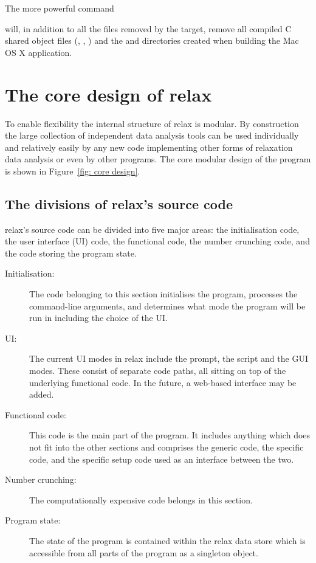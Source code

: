 The more powerful command


will, in addition to all the files removed by the  target, remove all compiled C shared object files (, , ) and the  and  directories created when building the Mac OS X application.




\section{The core design of relax}

To enable flexibility the internal structure of relax is modular.
By construction the large collection of independent data analysis tools can be used individually and relatively easily by any new code implementing other forms of relaxation data analysis or even by other programs.
The core modular design of the program is shown in Figure~\ref{fig: core design}.



\subsection{The divisions of relax's source code}

relax's source code can be divided into five major areas:  the initialisation code, the user interface (UI) code, the functional code, the number crunching code, and the code storing the program state.
\begin{description}
  \item[Initialisation:]  The code belonging to this section initialises the program, processes the command-line arguments, and determines what mode the program will be run in including the choice of the UI.
  \item[UI:]  The current UI modes in relax include the prompt, the script and the GUI modes.
    These consist of separate code paths, all sitting on top of the underlying functional code.
    In the future, a web-based interface may be added.
  \item[Functional code:]  This code is the main part of the program.
    It includes anything which does not fit into the other sections and comprises the generic code, the specific code, and the specific setup code used as an interface between the two.
  \item[Number crunching:]  The computationally expensive code belongs in this section.
  \item[Program state:]  The state of the program is contained within the relax data store which is accessible from all parts of the program as a singleton object.
\end{description}

